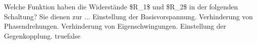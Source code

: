     {Welche Funktion haben die Widerstände \$R\_1\$ und \$R\_2\$ in der folgenden Schaltung? Sie dienen zur ...}
    {Einstellung der Basisvorspannung.}
    {Verhinderung von Phasendrehungen.}
    {Verhinderung von Eigenschwingungen.}
    {Einstellung der Gegenkopplung.}
    {true}{false}